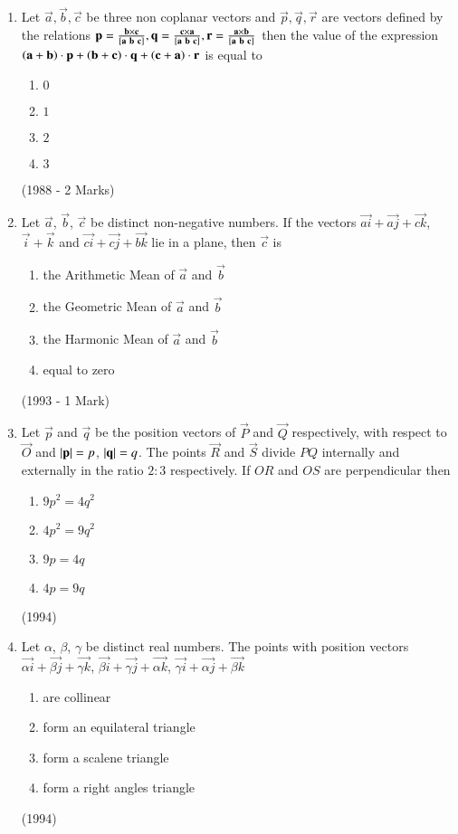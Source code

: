 \documentclass[journal]{IEEEtran}
\begin{document}
\begin{enumerate}
\item Let $\vec{a}, \vec{b}, \vec{c}$ be three non coplanar vectors and $\vec{p}, \vec{q},\vec{r}$ are vectors defined by the relations $\vec{p}=\frac{\vec{b}\times\vec{c}}{\sbrak{\vec{a}\ \vec{b}\ \vec{c}}}, \vec{q}=\frac{\vec{c}\times\vec{a}}{\sbrak{\vec{a}\ \vec{b}\ \vec{c}}},\vec{r}=\frac{\vec{a}\times\vec{b}}{\sbrak{\vec{a}\ \vec{b}\ \vec{c}}}$ then the value of the expression $\left(\mathbf{a}+\mathbf{b}\right)\cdot\mathbf{p}+\left(\mathbf{b}+\mathbf{c}\right)\cdot\mathbf{q}+\left(\mathbf{c}+\mathbf{a}\right)\cdot\mathbf{r}$ is equal to
\begin{enumerate}
\item $0$
\item $1$
\item $2$
\item $3$
\end{enumerate}
\hfill (1988 - 2 Marks)

\item Let $\vec{a}$, $\vec{b}$, $\vec{c}$ be distinct non-negative numbers. If the vectors $\vec{ai} + \vec{aj} + \vec{ck}$, $\vec{i}+\vec{k}$ and $\vec{ci}+\vec{cj}+\vec{bk}$ lie in a plane, then $\vec{c}$ is
\begin{enumerate}
\item the Arithmetic Mean of $\vec{a}$ and $\vec{b}$
\item the Geometric Mean of $\vec{a}$ and $\vec{b}$
\item the Harmonic Mean of $\vec{a}$ and $\vec{b}$
\item equal to zero
\end{enumerate}
\hfill (1993 - 1 Mark)

\item Let $\vec{p}$ and $\vec{q}$ be the position vectors of $\vec{P}$ and $\vec{Q}$ respectively, with respect to $\vec{O}$ and $\left\vert\mathbf{p}\right\vert = p$, $\left\vert\mathbf{q}\right\vert = q$. The points $\vec{R}$ and $\vec{S}$ divide $PQ$ internally and externally in the ratio $2\colon3$ respectively. If $OR$ and $OS$ are perpendicular then
\begin{enumerate}
\item $9p^2 =4q^2$
\item $4p^2 = 9q^2$
\item $9p = 4q$
\item $4p = 9q$
\end{enumerate}
\hfill (1994)

\item Let $\alpha$, $\beta$, $\gamma$ be distinct real numbers. The points with position vectors $\vec{\alpha i}+ \vec{\beta j} + \vec{\gamma k}$, $\vec{\beta i}+ \vec{\gamma j}+ \vec{\alpha k}$, $\vec{\gamma i} + \vec{\alpha j} + \vec{\beta k}$
\begin{enumerate}
\item are collinear
\item form an equilateral triangle
\item form a scalene triangle
\item form a right angles triangle
\end{enumerate}
\hfill (1994)


\end{enumerate}
\end{document}
